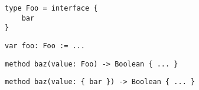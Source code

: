 \begin{lstlisting}[label={code:type-literal}, caption={A \emph{type literal} written in Grace}]
type Foo = interface {
    bar
} 
\end{lstlisting}

\begin{lstlisting}[label={code:type-annotation-variable}, caption={A \emph{variable declaration} annotated with a name referring to an expected type}]
var foo: Foo := ...
\end{lstlisting}

\begin{lstlisting}[label={code:type-annotation-method}, caption={A \emph{method declaration}, with its parameter and return value annotated by a name}]
method baz(value: Foo) -> Boolean { ... }
\end{lstlisting}


\begin{lstlisting}[label={code:type-annotation-literal}, caption={A \emph{method declaration}, with its parameter type annotated by a type literal}]
method baz(value: { bar }) -> Boolean { ... }
\end{lstlisting}




